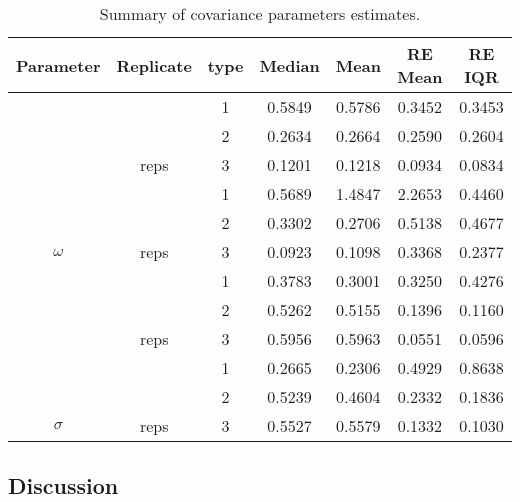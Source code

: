 \begin{table}[t]\centering
\caption{Summary of covariance parameters estimates.}  
\begin{knitrout}
\color{fgcolor}
\begin{tabular}{ccccccc}
\toprule
Parameter & Replicate & type & Median & Mean & RE Mean & RE IQR\\
\midrule
 &  & 1 & 0.5849 & 0.5786 & 0.3452 & 0.3453\\

 &  & 2 & 0.2634 & 0.2664 & 0.2590 & 0.2604\\

 & \multirow{-3}{*}{\centering\arraybackslash 30 reps} & 3 & 0.1201 & 0.1218 & 0.0934 & 0.0834\\
\cmidrule{2-7}
 &  & 1 & 0.5689 & 1.4847 & 2.2653 & 0.4460\\

 &  & 2 & 0.3302 & 0.2706 & 0.5138 & 0.4677\\

\multirow{-6}{*}{\centering\arraybackslash $\omega$} & \multirow{-3}{*}{\centering\arraybackslash 6 reps} & 3 & 0.0923 & 0.1098 & 0.3368 & 0.2377\\
\cmidrule{1-7}
 &  & 1 & 0.3783 & 0.3001 & 0.3250 & 0.4276\\

 &  & 2 & 0.5262 & 0.5155 & 0.1396 & 0.1160\\

 & \multirow{-3}{*}{\centering\arraybackslash 30 reps} & 3 & 0.5956 & 0.5963 & 0.0551 & 0.0596\\
\cmidrule{2-7}
 &  & 1 & 0.2665 & 0.2306 & 0.4929 & 0.8638\\

 &  & 2 & 0.5239 & 0.4604 & 0.2332 & 0.1836\\

\multirow{-6}{*}{\centering\arraybackslash $\sigma$} & \multirow{-3}{*}{\centering\arraybackslash 6 reps} & 3 & 0.5527 & 0.5579 & 0.1332 & 0.1030\\
\bottomrule
\end{tabular}


\end{knitrout}
\label{tab:fm-tab}
\end{table}



\subsection{Discussion}

